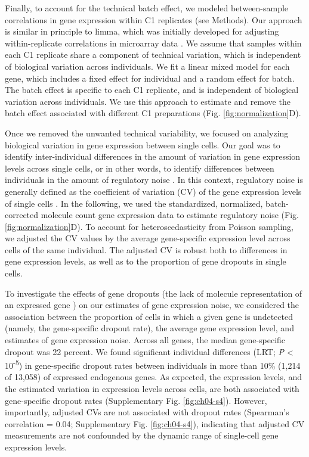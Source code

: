 Finally, to account for the technical batch effect, we modeled
between-sample correlations in gene expression within C1 replicates
(see Methods). Our approach is similar in principle to limma, which
was initially developed for adjusting within-replicate correlations in
microarray data \citep{Smyth2005}. We assume that samples within each
C1 replicate share a component of technical variation, which is
independent of biological variation across individuals. We fit a
linear mixed model for each gene, which includes a fixed effect for
individual and a random effect for batch. The batch effect is specific
to each C1 replicate, and is independent of biological variation
across individuals. We use this approach to estimate and remove the
batch effect associated with different C1 preparations
(Fig. \ref{fig:normalization}D).

Once we removed the unwanted technical variability, we focused on
analyzing biological variation in gene expression between single
cells.  Our goal was to identify inter-individual differences in the
amount of variation in gene expression levels across single cells, or
in other words, to identify differences between individuals in the
amount of regulatory noise \citep{Raser2005}. In this context,
regulatory noise is generally defined as the coefficient of variation
(CV) of the gene expression levels of single cells
\citep{Fehrmann2013}. In the following, we used the standardized,
normalized, batch-corrected molecule count gene expression data to
estimate regulatory noise (Fig. \ref{fig:normalization}D). To account
for heteroscedasticity from Poisson sampling, we adjusted the CV
values by the average gene-specific expression level across cells of
the same individual. The adjusted CV is robust both to differences in
gene expression levels, as well as to the proportion of gene dropouts
in single cells.

To investigate the effects of gene dropouts (the lack of molecule
representation of an expressed gene \citep{Brennecke2013, Shalek2013})
on our estimates of gene expression noise, we considered the
association between the proportion of cells in which a given gene is
undetected (namely, the gene-specific dropout rate), the average gene
expression level, and estimates of gene expression noise. Across all
genes, the median gene-specific dropout was 22 percent. We found
significant individual differences (LRT; \emph{P} \textless{}
10\textsuperscript{-5}) in gene-specific dropout rates between
individuals in more than 10\% (1,214 of 13,058) of expressed
endogenous genes. As expected, the expression levels, and the
estimated variation in expression levels across cells, are both
associated with gene-specific dropout rates (Supplementary
Fig. \ref{fig:ch04-s4}). However, importantly, adjusted CVs are not
associated with dropout rates (Spearman's correlation = 0.04;
Supplementary Fig. \ref{fig:ch04-s4}), indicating that adjusted CV
measurements are not confounded by the dynamic range of single-cell
gene expression levels.

